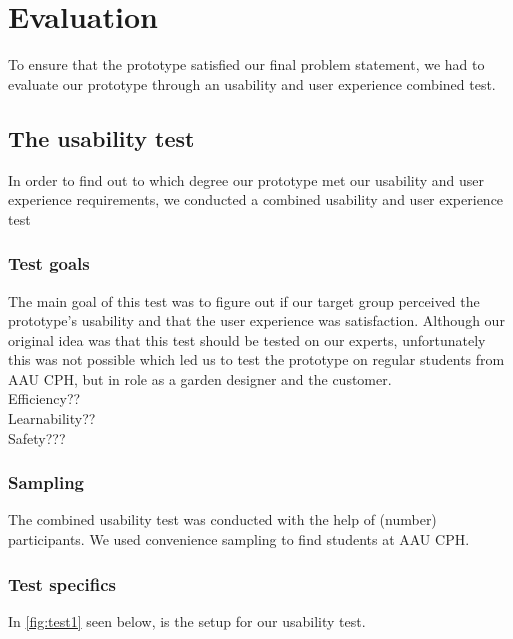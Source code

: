\chapter{Evaluation}
To ensure that the prototype satisfied our final problem statement, we had to evaluate our prototype through an usability and user experience combined test. 

\section{The usability test}
In order to find out to which degree our prototype met our usability and user experience requirements, we conducted a combined usability and user experience test

\subsection{Test goals}
The main goal of this test was to figure out if our target group perceived the prototype's usability and that the user experience was satisfaction. Although our original idea was that this test should be tested on our experts, unfortunately this was not possible which led us to test the prototype on regular students from AAU CPH, but in role as a garden designer and the customer.\\
Efficiency??\\
Learnability??\\
Safety???\\

\subsection{Sampling}
The combined usability test was conducted with the help of (number) participants. We used convenience sampling to find students at AAU CPH.

\subsection{Test specifics}
In \autoref{fig:test1} seen below, is the setup for our usability test.

